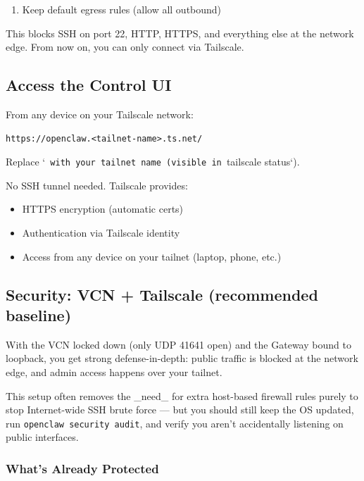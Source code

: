\begin{enumerate}
  \item Keep default egress rules (allow all outbound)
\end{enumerate}


This blocks SSH on port 22, HTTP, HTTPS, and everything else at the network edge. From now on, you can only connect via Tailscale.

\hrulefill


\subsection{Access the Control UI}


From any device on your Tailscale network:

\begin{lstlisting}
https://openclaw.<tailnet-name>.ts.net/
\end{lstlisting}


Replace `\texttt{ with your tailnet name (visible in }tailscale status`).

No SSH tunnel needed. Tailscale provides:

\begin{itemize}
  \item HTTPS encryption (automatic certs)
  \item Authentication via Tailscale identity
  \item Access from any device on your tailnet (laptop, phone, etc.)
\end{itemize}


\hrulefill


\subsection{Security: VCN + Tailscale (recommended baseline)}


With the VCN locked down (only UDP 41641 open) and the Gateway bound to loopback, you get strong defense-in-depth: public traffic is blocked at the network edge, and admin access happens over your tailnet.

This setup often removes the \_need\_ for extra host-based firewall rules purely to stop Internet-wide SSH brute force — but you should still keep the OS updated, run \texttt{openclaw security audit}, and verify you aren’t accidentally listening on public interfaces.

\subsubsection{What's Already Protected}



